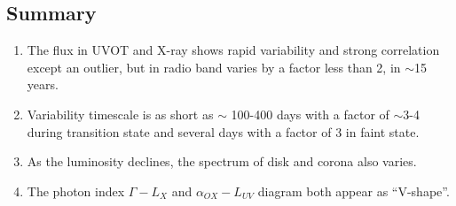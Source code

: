 \documentclass[twocolumn]{aastex63}
\begin{document}
 
 



 
 



















%

\subsection{Summary}
\begin{enumerate}
\item The flux in UVOT and X-ray shows rapid variability and strong correlation except an outlier, but in radio band varies by a factor less than 2, in $\sim$15 years. 

\item Variability timescale is as short as $\sim$ 100-400 days with a factor of $\sim$3-4 during transition state and several days with a factor of 3 in faint state.

\item As the luminosity declines, the spectrum of disk and corona also varies.

\item The photon index $\Gamma-L_{X}$ and $\alpha_{OX}-L_{UV}$ diagram both appear as ``V-shape''. 
\end{enumerate}
\end{document}
